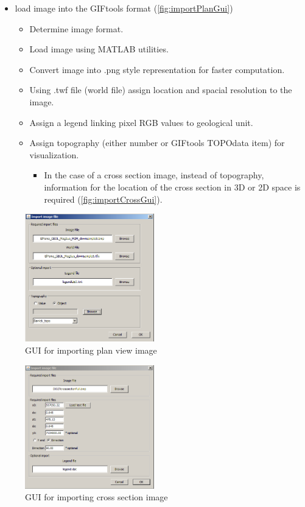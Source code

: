 \begin{itemize}
\item load image into the GIFtools format (\autoref{fig:importPlanGui})
\begin{itemize}
	\item Determine image format.
	\item Load image using MATLAB utilities.
	\item Convert image into .png style representation for faster computation.
	\item Using .twf file (world file) assign location and spacial resolution to the image.
	\item Assign a legend linking pixel RGB values to geological unit.
	\item Assign topography (either number or GIFtools TOPOdata item) for visualization.
	\begin{itemize}
		\item In the case of a cross section image, instead of topography, information for the location of the cross section in 3D or 2D space is required (\autoref{fig:importCrossGui}).
	\end{itemize}
\end{itemize}
\end{itemize}
\begin{figure} [h]
    \centering
    \includegraphics[width=0.5\textwidth]{images/MaptoModel/importPlan.PNG}
    \caption{GUI for importing plan view image }
    \label{fig:importPlanGui}
\end{figure}
\begin{figure} [h]
    \centering
    \includegraphics[width=0.5\textwidth]{images/MaptoModel/importCross.PNG}
    \caption{GUI for importing cross section image }
    \label{fig:importCrossGui}
\end{figure}
